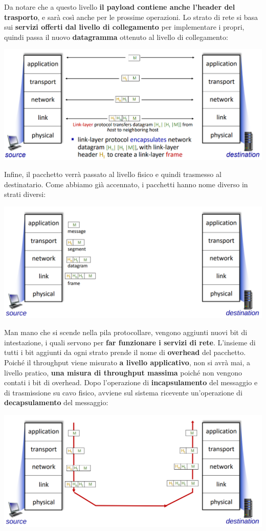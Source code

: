 \documentclass[12pt]{article}
\begin{document}
Da notare che a questo livello \textbf{il payload contiene anche l'header del trasporto}, e sarà così anche per le prossime operazioni.
Lo strato di rete si basa sui \textbf{servizi offerti dal livello di collegamento} per implementare i propri, quindi passa il nuovo \textbf{datagramma} ottenuto al livello di collegamento:
\begin{center}
    \includegraphics[width =1\linewidth]{Images/28.PNG}
\end{center}
Infine, il pacchetto verrà passato al livello fisico e quindi trasmesso al destinatario.
Come abbiamo già accennato, i pacchetti hanno  nome diverso in strati diversi:
\begin{center}
    \includegraphics[width =1\linewidth]{Images/29.png}
\end{center}
Man mano che si scende nella pila protocollare, vengono aggiunti nuovi bit di intestazione, i quali servono per \textbf{far funzionare i servizi di rete}.
L'insieme di tutti i bit aggiunti da ogni strato prende il nome di \textbf{overhead} del pacchetto. Poiché il throughput viene misurato \textbf{a livello applicativo},
non si avrà mai, a livello pratico, \textbf{una misura di throughput massima} poiché non vengono contati i bit di overhead. Dopo l'operazione di \textbf{incapsulamento} del messaggio
e di trasmissione su cavo fisico, avviene sul sistema ricevente un'operazione di \textbf{decapsulamento} del messaggio:
\begin{center}
    \includegraphics[width =1\linewidth]{Images/30.png}
\end{center}
\end{document}
